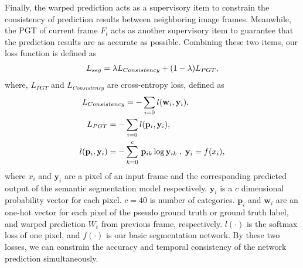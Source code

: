 Finally, the warped prediction acts as a supervisory item to constrain the consistency of prediction results between neighboring image frames.
%
Meanwhile, the PGT of current frame $F_t$ acts as another supervisory item to guarantee that the prediction results are as accurate as possible.
Combining these two items, our loss function is defined as
\begin{equation}
\centering
\begin{aligned}
L_{seg}= \lambda L_{Consistency} +(1-\lambda)L_{PGT},
\end{aligned}
\end{equation}
%
where, ${L_{PGT}}$ and ${L_{Consistency}}$ are cross-entropy loss, defined as
\begin{equation}
{
\vspace*{-0.6cm} 
\centering     
\begin{aligned} 
L_{Consistency} &= -\sum_{i=0} l(\mathbf{w}_i,\mathbf{y}_i),\\
L_{PGT} = -&\sum_{i=0} l(\mathbf{p}_i,\mathbf{y}_i), \\
l(\mathbf{p}_i,\mathbf{y}_i) = -&\sum_{k=0}^c \,\mathbf{p}_{ik}\log{\mathbf{y}_{ik}}\;,\; \mathbf{y}_{i} = f(x_{i}),\\
\end{aligned}
}
\end{equation}
%
where ${x_i}$ and ${\mathbf{y}_i}$ are a pixel of an input frame and the corresponding predicted output of the semantic segmentation model respectively. 
%
$\mathbf{y}_i$ is a $c$ dimensional probability vector for each pixel.
${c}=40$ is number of categories.
%
${\mathbf{p}_i}$ and ${\mathbf{w}_i}$ are an one-hot vector for each pixel of the pseudo ground truth or ground truth label, and warped prediction $W_{t}$ from previous frame, respectively. 
%
${l(\cdot)}$ is the softmax loss of one pixel, and ${f(\cdot)}$ is our basic segmentation network. 
%
By these two losses, we can constrain the accuracy and temporal consistency of the network prediction simultaneously.
